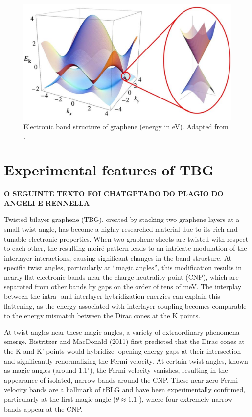 \begin{figure}[H]
\centering
\includegraphics[width=0.8\linewidth]{fig/monolayer_dispersion.png}
\caption{Electronic band structure of graphene (energy in eV). Adapted from \cite{geim2009}.}
\label{fig:monolayer_dispersion}
\end{figure}

\section{Experimental features of TBG}

\n
\textbf{O SEGUINTE TEXTO FOI CHATGPTADO DO PLAGIO DO ANGELI E RENNELLA}
\n


Twisted bilayer graphene (TBG), created by stacking two graphene layers at a small twist angle, has become a highly researched material due to its rich and tunable electronic properties. When two graphene sheets are twisted with respect to each other, the resulting moiré pattern leads to an intricate modulation of the interlayer interactions, causing significant changes in the band structure. At specific twist angles, particularly at ``magic angles'', this modification results in nearly flat electronic bands near the charge neutrality point (CNP), which are separated from other bands by gaps on the order of tens of meV. The interplay between the intra- and interlayer hybridization energies can explain this flattening, as the energy associated with interlayer coupling becomes comparable to the energy mismatch between the Dirac cones at the K points.

At twist angles near these magic angles, a variety of extraordinary phenomena emerge. Bistritzer and MacDonald (2011) first predicted that the Dirac cones at the K and K' points would hybridize, opening energy gaps at their intersection and significantly renormalizing the Fermi velocity. At certain twist angles, known as magic angles (around 1.1$^\circ$), the Fermi velocity vanishes, resulting in the appearance of isolated, narrow bands around the CNP. These near-zero Fermi velocity bands are a hallmark of tBLG and have been experimentally confirmed, particularly at the first magic angle (\(\theta \approx 1.1^\circ\)), where four extremely narrow bands appear at the CNP.

